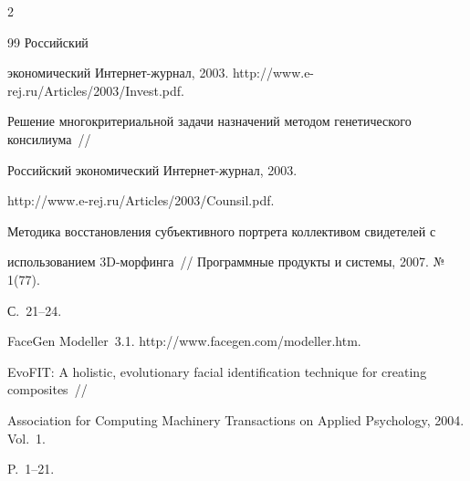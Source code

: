 \begin{multicols}{2}
{{\begin{thebibliography}{99}
Российский 


экономический Интернет-журнал, 2003. {\sf http://www.e-rej.ru/Articles/2003/Invest.pdf}.









Решение многокритериальной задачи назначений методом генетического консилиума~// 


Российский экономический Интернет-журнал, 2003.\linebreak 


{\sf http://www.e-rej.ru/Articles/2003/Counsil.pdf}.









Методика восстановления субъективного портрета коллективом свидетелей с 


использованием 3D-мор\-фин\-га~// Программные продукты и системы, 2007.  №\,1(77). 


С.~21--24. 







FaceGen Modeller~3.1. {\sf http://www.facegen.com/\linebreak modeller.htm}.





\label{end\stat}









EvoFIT: A holistic, evolutionary facial identification technique for creating composites~// 


Association for Computing Machinery Transactions on Applied Psychology, 2004. Vol.~1. 


P.~1--21. 


 \end{thebibliography}


}


}


\end{multicols}


